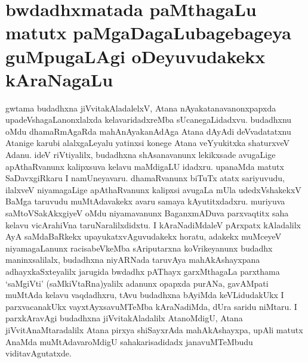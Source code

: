 \makeatletter
\def\@makechapterhead#1{%
  \vspace*{10\p@}%
{\fontsize{13pt}{13pt}\selectfont\raggedright{\bf pi. vi. bApaTf matutx naLinAkaSxdatf}\par}
\vspace*{25\p@}%
  {\parindent \z@ \centering \normalfont
    \ifnum \c@secnumdepth >\m@ne
      \if@mainmatter
        {\LARGE\bfseries  #1}\par\nobreak
	\vskip 4pt
      \fi
    \fi
\smallskip 

 \vskip 10\p@  
{\fontsize{12pt}{12pt}\selectfont\raggedleft{anu: \bf pu.ti.na.}\par}
  }
\vskip 40\p@}
\makeatother

\chapter[bwdadhxmatada paMthagaLu matutx paMgaDagaLu bagebageya guMpugaLAgi oDeyuvudakekx kAraNagaLu]{bwdadhxmatada paMthagaLu matutx paMgaDagaLu\break bagebageya guMpugaLAgi oDeyuvudakekx kAraNagaLu}



gwtama budadhxna jiVvitakAladalelxV, Atana nAyakatanavanonxpapxda upadeVshagaLanonxlalxda kelavaridadxreMba sUcanegaLidadxvu. budadhxnu oMdu dhamaRmAgaRda mahAnAyaka\-nAdAga Atana dAyAdi deVvadatatxnu Atanige karubi alalxgaLeyalu yatinxsi konege Atana veYyukitxka shaturxveV Adanu. ideV riVtiyalilx, budadhxna shAsanavanunx lekikxsade avugaLige apAthaRvanunx kalipxsuva kelavu maMdigaLU idadxru. upanaMda matutx SaDavxgiRkaru I namUneyavaru. dhamaRvanunx biTuTx atatx sariyuvudu, ilalxveV niyamagaLige apAthaRvanunx kalipxsi avugaLa mUla udedxVshakekxV BaMga taruvudu muMtAdavakekx avaru samaya kAyutitxdadxru. muriyuva saMtoVSakAkxgiyeV oMdu niyamavanunx BaganxmADuva parxvaqtitx saha kelavu vicArahiVna taruNaralilxdidxtu. I kAraNadiMdaleV pArxpatx kAladalilx AyA saMdaBaRkekx upayukatxvAguvudakekx horatu, adakekx muMceyeV niyamagaLanunx racisabeVkeMba sAriputarxna koVrikeyanunx budadhx maninxsalilalx, budadhxna niyARNada taruvAya mahAkAshayxpana adhayxkaSxteyalilx jarugida bwdadhx pAThayx garxMthagaLa parxthama `saMgiVti' (saMkiVtaRna)yalilx adanunx opapxda purANa, gavAMpati muMtAda kelavu vaqdadhxru, tAvu budadhxna bAyiMda keVLidudakUkx I parxvacanakUkx vayxtAyxsavuMTeMba kAraNadiMda, dUra saridu niMtaru. I parxkAravAgi budadhxna jiVvitakAladalilx AtanoMdigU, Atana jiVvitAnaMtaradalilx Atana pirxya shiSayxrAda mahAkAshayxpa, upAli matutx AnaMda muMtAdavaroMdigU sahakarisadidadx janavuMTeMbudu viditavAgutatxde.

